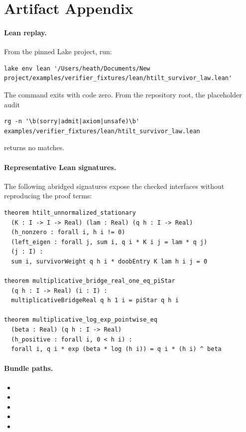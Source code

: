 \section{Artifact Appendix}

\paragraph{Lean replay.}
From the pinned Lake project, run:

\begin{Verbatim}[fontsize=\scriptsize]
lake env lean '/Users/heath/Documents/New project/examples/verifier_fixtures/lean/htilt_survivor_law.lean'
\end{Verbatim}

The command exits with code zero. From the repository root, the placeholder
audit

\begin{Verbatim}[fontsize=\scriptsize]
rg -n '\b(sorry|admit|axiom|unsafe)\b' examples/verifier_fixtures/lean/htilt_survivor_law.lean
\end{Verbatim}

returns no matches.

\paragraph{Representative Lean signatures.}
The following abridged signatures expose the checked interfaces without
reproducing the proof terms:
\begin{Verbatim}[fontsize=\scriptsize]
theorem htilt_unnormalized_stationary
  (K : I -> I -> Real) (lam : Real) (q h : I -> Real)
  (h_nonzero : forall i, h i != 0)
  (left_eigen : forall j, sum i, q i * K i j = lam * q j)
  (j : I) :
  sum i, survivorWeight q h i * doobEntry K lam h i j = 0

theorem multiplicative_bridge_real_one_eq_piStar
  (q h : I -> Real) (i : I) :
  multiplicativeBridgeReal q h 1 i = piStar q h i

theorem multiplicative_log_exp_pointwise_eq
  (beta : Real) (q h : I -> Real)
  (h_positive : forall i, 0 < h i) :
  forall i, q i * exp (beta * log (h i)) = q i * (h i) ^ beta
\end{Verbatim}

\paragraph{Bundle paths.}
\begin{itemize}[leftmargin=*,nosep]
  \item {}
  \item {}
  \item {}
  \item {}
  \item {}
\end{itemize}

